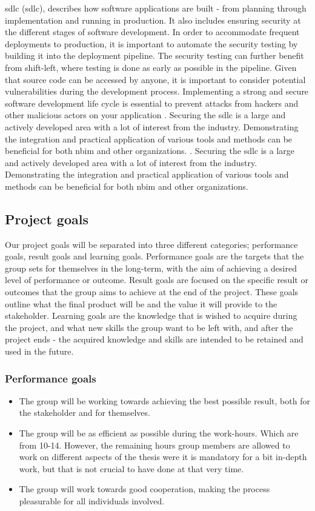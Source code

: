 \acrlong{sdlc} (\acrshort{sdlc}), describes how software applications are built - from planning through implementation and running in production. It also includes ensuring security at the different stages of software development. In order to accommodate frequent deployments to production, it is important to automate the security testing by building it into the deployment pipeline. The security testing can further benefit from shift-left, where testing is done as early as possible in the pipeline. Given that source code can be accessed by anyone, it is important to consider potential vulnerabilities during the development process. Implementing a strong and secure software development life cycle is essential to prevent attacks from hackers and other malicious actors on your application 
\cite{sdlc1}. Securing the \acrshort{sdlc} is a large and actively developed area with a lot of interest from the industry. Demonstrating the integration and practical application of various tools and methods can be beneficial for both \acrshort{nbim} and other organizations.
\cite{sdlc1}. Securing the \acrshort{sdlc} is a large and actively developed area with a lot of interest from the industry. Demonstrating the integration and practical application of various tools and methods can be beneficial for both \acrshort{nbim} and other organizations.


\subsection{Project goals}
Our project goals will be separated into three different categories; performance goals, result goals and learning goals. Performance goals are the targets that the group sets for themselves in the long-term, with the aim of achieving a desired level of performance or outcome. Result goals are focused on the specific result or outcomes that the group aims to achieve at the end of the project. These goals outline what the final product will be and the value it will provide to the stakeholder. Learning goals are the knowledge that is wished to acquire during the project, and what new skills the group want to be left with, and after the project ends - the acquired knowledge and skills are intended to be retained and used in the future. 

\subsubsection{Performance goals}
\begin{itemize}
    \item  The group will be working towards achieving the best possible result, both for the stakeholder and for themselves.
    \item The group will be as efficient as possible during the work-hours. Which are from 10-14. However, the remaining hours group members are allowed to work on different aspects of the thesis were it is mandatory for a bit in-depth work, but that is not crucial to have done at that very time. 
    \item The group will work towards good cooperation, making the process pleasurable for all individuals involved.
\end{itemize}


